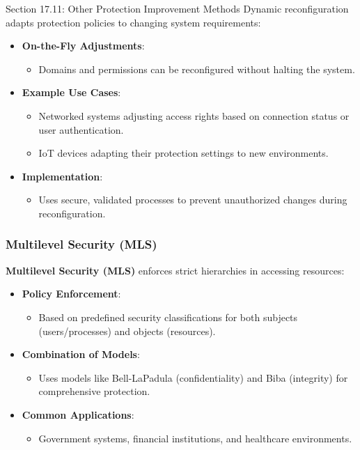 \begin{notes}{Section 17.11: Other Protection Improvement Methods}
    Dynamic reconfiguration adapts protection policies to changing system requirements:
    \begin{itemize}
        \item \textbf{On-the-Fly Adjustments}:
        \begin{itemize}
            \item Domains and permissions can be reconfigured without halting the system.
            \end{itemize}
        \item \textbf{Example Use Cases}:
        \begin{itemize}
            \item Networked systems adjusting access rights based on connection status or user authentication.
            \item IoT devices adapting their protection settings to new environments.
        \end{itemize}
        \item \textbf{Implementation}:
        \begin{itemize}
            \item Uses secure, validated processes to prevent unauthorized changes during reconfiguration.
        \end{itemize}
    \end{itemize}
    
    \subsubsection*{Multilevel Security (MLS)}
    
    \textbf{Multilevel Security (MLS)} enforces strict hierarchies in accessing resources:
    \begin{itemize}
        \item \textbf{Policy Enforcement}:
        \begin{itemize}
            \item Based on predefined security classifications for both subjects (users/processes) and objects (resources).
            \end{itemize}
        \item \textbf{Combination of Models}:
        \begin{itemize}
            \item Uses models like Bell-LaPadula (confidentiality) and Biba (integrity) for comprehensive protection.
        \end{itemize}
        \item \textbf{Common Applications}:
        \begin{itemize}
            \item Government systems, financial institutions, and healthcare environments.
        \end{itemize}
    \end{itemize}
    

\end{notes}
